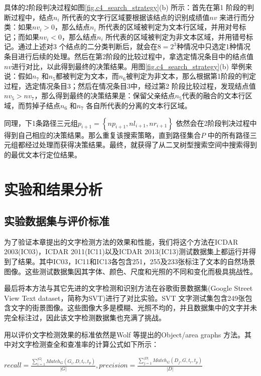         具体的2阶段判决过程如图\ref{fig.c4_search_strategy}(b) 所示：首先在第1 阶段的判断过程中，结点$n_i$ 所代表的文字行区域要根据该结点的识别成绩值$nv$ 来进行而分类：如果$nv_i>0$，那么结点$n_i$ 所代表的区域被判定为文本行区域，并用对号标记；而如果$nv_i<0$，那么结点$n_i$ 所代表的区域被判定为非文本区域，并用错号标记。通过上述对3 个结点的二分类判断后，就会在$8=2^3$种情况中只选定1种情况条目进行后续的处理。然后在第2阶段的比较过程中，拿选定情况条目中的结点值$nv$进行对比，以此得到最终的决策结果。用图\ref{fig.c4_search_strategy}(b) 举例来说：假如$n_7$ 和$n_5$都被判定为文本，而$n_6$被判定为非文本，那么根据第1阶段的判定过程，选定情况条目3；然后在情况条目3中，经过第2 阶段比较过程，发现结点值$nv_5>nv_7$，那么得到最终的决策结果是：保留父亲结点$n_5$代表的融合的文本行区域，而剪掉子结点$n_6$ 和$n_7$ 各自所代表的分离的文本行区域。

        同理，下1条路径三元组$p_{i+1}=\left\{np_{i+1},nl_{i+1},nr_{i+1}\right\}$ 依然会在2阶段判决过程中得到自己相应的决策结果。那么重复该搜索策略，直到路径集合$P$ 中的所有路径三元组都经过处理而获得决策结果。最终，就获得了从二叉树型搜索空间中搜索得到的最优文本行定位结果。

    \section{实验和结果分析}

        \subsection{实验数据集与评价标准}

        为了验证本章提出的文字检测方法的效果和性能，我们将这个方法在ICDAR 2003(IC03)，ICDAR 2011(IC11)以及ICDAR 2013(IC13)测试数据集上都运行并得到了结果。其中IC03，IC11和IC13各包含251，255及233张标注了文本的自然场景图像。这些测试数据集因其字体、颜色、尺度和光照的不同和变化而极具挑战性。

        最后将本方法与其它先进的文字检测和识别方法在谷歌街景数据集(Google Street View Text dataset，简称为SVT)进行了对比实验。SVT 文字测试集包含249张包含文字的街景图像。这些图像大多是模糊、光照不均的，并且数据集中的文字并未完全标注过，因此该文字检测数据集也充满了挑战。

        用以评价文字检测效果的标准依然是Wolf 等\cite{Wolf2006Object}提出的Object/area graphs 方法。其中对文字检测查全和查准率的计算公式如下所示：

        $recall = \frac {\sum_{i=1}^{|G|}Match_G(G_i,D,t_r,t_p)} {|G|}  ,   precision =\frac {\sum_{j=1}^{|D|}Match_G(D_j,G,t_r,t_p)} {|D|}$


